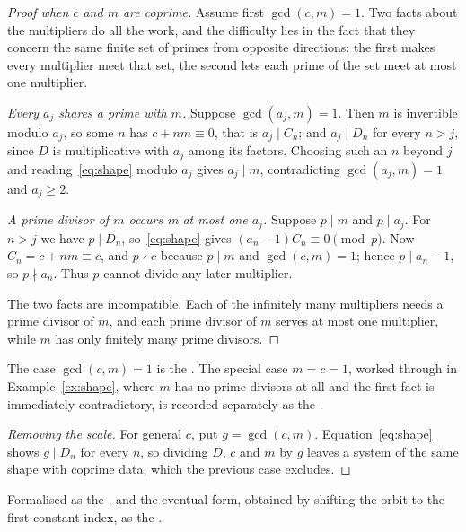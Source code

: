 \begin{proof}[Proof when $c$ and $m$ are coprime]
Assume first $\gcd(c,m)=1$.  Two facts about the multipliers do all the work,
and the difficulty lies in the fact that they concern the same finite set of
primes from opposite directions: the first makes every multiplier meet that
set, the second lets each prime of the set meet at most one multiplier.

\emph{Every $a_j$ shares a prime with $m$.}  Suppose $\gcd(a_j,m)=1$.  Then
$m$ is invertible modulo $a_j$, so some $n$ has $c+nm\equiv0$, that is
$a_j\mid C_n$; and $a_j\mid D_n$ for every $n>j$, since $D$ is multiplicative
with $a_j$ among its factors.  Choosing such an $n$ beyond $j$
and reading~\eqref{eq:shape} modulo $a_j$ gives $a_j\mid m$, contradicting
$\gcd(a_j,m)=1$ and $a_j\ge2$.

\emph{A prime divisor of $m$ occurs in at most one $a_j$.}  Suppose $p\mid m$
and $p\mid a_j$.  For $n>j$ we have $p\mid D_n$, so~\eqref{eq:shape} gives
$(a_n-1)C_n\equiv0 \pmod p$.  Now $C_n=c+nm\equiv c$, and $p\nmid c$ because
$p\mid m$ and $\gcd(c,m)=1$; hence $p\mid a_n-1$, so $p\nmid a_n$.  Thus $p$
cannot divide any later multiplier.

The two facts are incompatible.  Each of the infinitely many multipliers needs
a prime divisor of $m$, and each prime divisor of $m$ serves at most one
multiplier, while $m$ has only finitely many prime divisors.
\end{proof}

\noindent The case $\gcd(c,m)=1$ is the
.  The special case $m=c=1$, worked through in
Example~\ref{ex:shape}, where $m$ has no prime divisors at all and the first
fact is immediately contradictory, is recorded separately as the
.

\begin{proof}[Removing the scale]
For general $c$, put $g=\gcd(c,m)$.  Equation~\eqref{eq:shape} shows
$g\mid D_n$ for every $n$, so dividing $D$, $c$ and $m$ by $g$ leaves a system
of the same shape with coprime data, which the previous case excludes.
\end{proof}

\noindent Formalised as the
, and the eventual form, obtained by shifting the orbit to the
first constant index, as the
.

